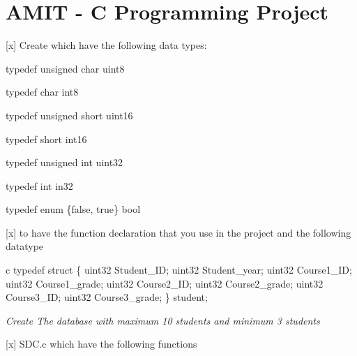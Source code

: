 \chapter{AMIT -\/ C Programming Project}
\hypertarget{md__d_1_2computer-science_2_a_m_i_t-_embedded__systems__course_2_c-_programming_project_2readme}{}\label{md__d_1_2computer-science_2_a_m_i_t-_embedded__systems__course_2_c-_programming_project_2readme}
\label{md__d_1_2computer-science_2_a_m_i_t-_embedded__systems__course_2_c-_programming_project_2readme_autotoc_md0}%
%

\begin{DoxyItemize}
\item \mbox{[}x\mbox{]} Create {\ttfamily {}} which have the following data types\+:
\begin{DoxyItemize}
\item {\ttfamily typedef unsigned char uint8}
\item {\ttfamily typedef char int8}
\item {\ttfamily typedef unsigned short uint16}
\item {\ttfamily typedef short int16}
\item {\ttfamily typedef unsigned int uint32}
\item {\ttfamily typedef int in32}
\item {\ttfamily typedef enum \{false, true\} bool}
\end{DoxyItemize}
\item \mbox{[}x\mbox{]} {\ttfamily {}} to have the function declaration that you use in the project and the following datatype
\begin{DoxyItemize}
\item {\ttfamily c typedef struct \{ uint32 Student\+\_\+\+ID; uint32 Student\+\_\+year; uint32 Course1\+\_\+\+ID; uint32 Course1\+\_\+grade; uint32 Course2\+\_\+\+ID; uint32 Course2\+\_\+grade; uint32 Course3\+\_\+\+ID; uint32 Course3\+\_\+grade; \} student; }
\item {\itshape Create The database with maximum 10 students and minimum 3 students}
\end{DoxyItemize}
\item \mbox{[}x\mbox{]} {\ttfamily SDC.\+c} which have the following functions
\begin{DoxyItemize}

\end{DoxyItemize}
\end{DoxyItemize}
